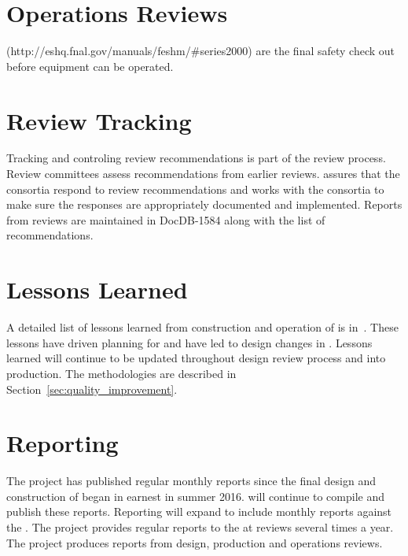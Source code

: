 \section{Operations Reviews}

 (http://eshq.fnal.gov/manuals/feshm/\#series2000) are the
final safety check out before equipment can be operated.

\section{Review Tracking}

Tracking and controling review recommendations is part of the review
process. Review committees assess recommendations from earlier
reviews.  assures that the consortia respond to review
recommendations and works with the consortia to make sure the
responses are appropriately documented and implemented. Reports from
 reviews are maintained in DocDB-1584 along with the list
of recommendations.


\section{Lessons Learned}
\label{sec:fdsp-coord-lessons}

A detailed list of lessons learned from construction and operation of
 is in~\cite{bib:docdb8255}. These lessons have driven planning for
 and have led to design changes in . Lessons
learned will continue to be updated throughout design review process
and into production. The methodologies are described in
Section~\ref{sec:quality_improvement}. %


\section{Reporting}
\label{sec:fdsp-coord-reporting}

The  project has published regular monthly reports since
the final design and construction of  began in
earnest in summer 2016.  will continue to compile and
publish these reports. Reporting will expand to include monthly
reports against the . The  project provides
regular reports to the  at reviews several times a
year. The  project produces reports from design,
production and operations reviews.
